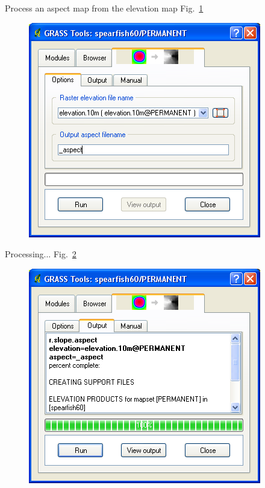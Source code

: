 Process an aspect map from the elevation map Fig.~\ref{fig:qgis042}

\begin{figure}[htbp]
   \centering
   \includegraphics[scale=0.45]{qgis042.png}
   \caption{}
   \label{fig:qgis042}
\end{figure}

Processing... Fig.~\ref{fig:qgis043}

\begin{figure}[htbp]
   \centering
   \includegraphics[scale=0.45]{qgis043.png}
   \caption{}
   \label{fig:qgis043}
\end{figure}

